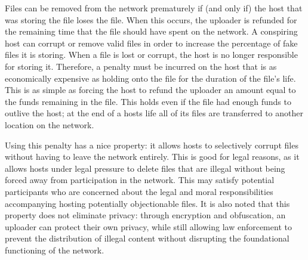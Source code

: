 \documentclass[twocolumn]{article}
\begin{document}
Files can be removed from the network prematurely if (and only if) the host that was storing the file loses the file.
When this occurs, the uploader is refunded for the remaining time that the file should have spent on the network.
A conspiring host can corrupt or remove valid files in order to increase the percentage of fake files it is storing.
When a file is lost or corrupt, the host is no longer responsible for storing it.
Therefore, a penalty must be incurred on the host that is as economically expensive as holding onto the file for the duration of the file's life.
This is as simple as forcing the host to refund the uploader an amount equal to the funds remaining in the file.
This holds even if the file had enough funds to outlive the host; at the end of a hosts life all of its files are transferred to another location on the network.

Using this penalty has a nice property: it allows hosts to selectively corrupt files without having to leave the network entirely.
This is good for legal reasons, as it allows hosts under legal pressure to delete files that are illegal without being forced away from participation in the network.
This may satisfy potential participants who are concerned about the legal and moral responsibilities accompanying hosting potentially objectionable files.
It is also noted that this property does not eliminate privacy: through encryption and obfuscation, an uploader can protect their own privacy, while still allowing law enforcement to prevent the distribution of illegal content without disrupting the foundational functioning of the network.
\end{document}
